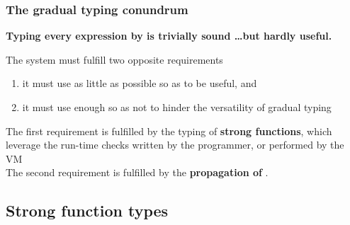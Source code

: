 \begin{frame}
\frametitle{The gradual typing conundrum}
\textbf{\color{darkslateblue}Typing every expression by  is trivially sound \ldots but hardly useful.}

\bigskip
\pause
The system must fulfill two opposite requirements
\begin{enumerate}
	\item it must use   as little as possible so as to be useful, and
	\item it must use  enough so as not to hinder the versatility of
	      gradual typing
\end{enumerate}


\bigskip
\pause
The first requirement is fulfilled by the typing of \textbf{\color{darkslateblue}strong functions}, which leverage the run-time checks written by the programmer, or performed by the VM\\[3mm]
The second requirement is fulfilled by the \textbf{\color{darkslateblue}propagation of }.
\end{frame}

\subsection{Strong function types}

